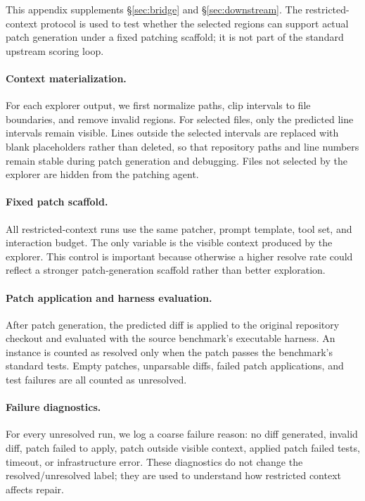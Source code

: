 This appendix supplements \S\ref{sec:bridge} and \S\ref{sec:downstream}. The
restricted-context protocol is used to test whether the selected regions can
support actual patch generation under a fixed patching scaffold; it is not part
of the standard upstream scoring loop.

\paragraph{Context materialization.}
For each explorer output, we first normalize paths, clip intervals to file
boundaries, and remove invalid regions. For selected files, only the predicted
line intervals remain visible. Lines outside the selected intervals are replaced
with blank placeholders rather than deleted, so that repository paths and line
numbers remain stable during patch generation and debugging. Files not selected
by the explorer are hidden from the patching agent.

\paragraph{Fixed patch scaffold.}
All restricted-context runs use the same patcher, prompt template, tool set, and
interaction budget. The only variable is the visible context produced by the
explorer. This control is important because otherwise a higher resolve rate
could reflect a stronger patch-generation scaffold rather than better
exploration.

\paragraph{Patch application and harness evaluation.}
After patch generation, the predicted diff is applied to the original repository
checkout and evaluated with the source benchmark's executable harness. An
instance is counted as resolved only when the patch passes the benchmark's
standard tests. Empty patches, unparsable diffs, failed patch applications, and
test failures are all counted as unresolved.

\paragraph{Failure diagnostics.}
For every unresolved run, we log a coarse failure reason: no diff generated,
invalid diff, patch failed to apply, patch outside visible context, applied patch
failed tests, timeout, or infrastructure error. These diagnostics do not change
the resolved/unresolved label; they are used to understand how restricted
context affects repair.


